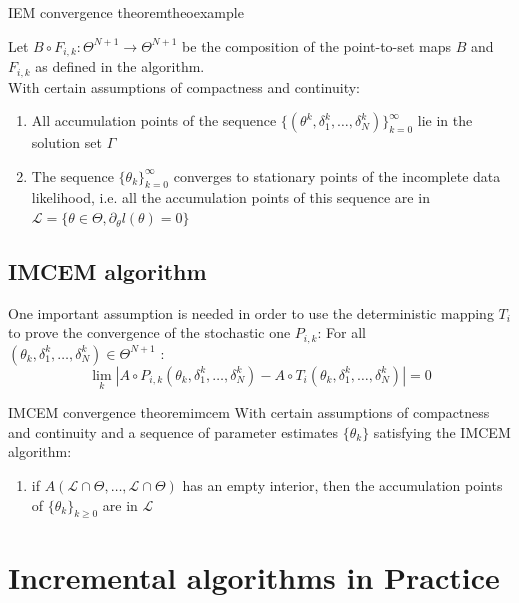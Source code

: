 \documentclass[a0,portrait]{a0poster}
\begin{document}
\begin{multicols}{2}
\begin{mytheo}{IEM convergence theorem}{theoexample}

Let $B \circ F_{i,k}: \Theta^{N+1} \to \Theta^{N+1}$ be the composition of the point-to-set maps $B$ and $F_{i,k}$ as defined in the algorithm.\\
With certain assumptions of compactness and continuity:
\begin{enumerate}
\item All accumulation points of the sequence $\{(\theta^k, \delta_1^k,\dots, \delta_N^k)\}_{k=0}^{\infty}$ lie in the solution set $\Gamma$
\item The sequence $\{\theta_k\}_{k=0}^{\infty}$ converges to stationary points of the incomplete data likelihood, i.e. all the accumulation points of this sequence are in  $\mathcal{L} = \{\theta \in \Theta, \partial_{\theta}l(\theta) = 0 \}$
\end{enumerate}

\end{mytheo}



\subsection{IMCEM algorithm}
One important assumption is needed in order to use the deterministic mapping $T_{i}$ to prove the convergence of the stochastic one $P_{i,k}$:
For all $(\theta_k, \delta_1^k,\dots,\delta_N^k) \in \Theta^{N+1}$ :
\begin{equation*}
\lim\limits_{k} |A \circ P_{i,k}(\theta_k, \delta_1^k,\dots,\delta_N^k) - A \circ T_i(\theta_k, \delta_1^k,\dots,\delta_N^k)| = 0
\end{equation*}

 \begin{mytheo}{IMCEM convergence theorem}{imcem}
With certain assumptions of compactness and continuity and a sequence of parameter estimates $\{\theta_{k}\}$ satisfying the IMCEM algorithm:
\begin{enumerate}
  \item if $A(\mathcal{L}\cap\Theta,\dots,\mathcal{L}\cap\Theta)$ has an empty interior, then the accumulation points of $\{\theta_{k}\}_{k \geq 0}$ are in $\mathcal{L}$
\end{enumerate}
\end{mytheo}
   
   
   
\section{Incremental algorithms in Practice}

\end{multicols}
\end{document}
